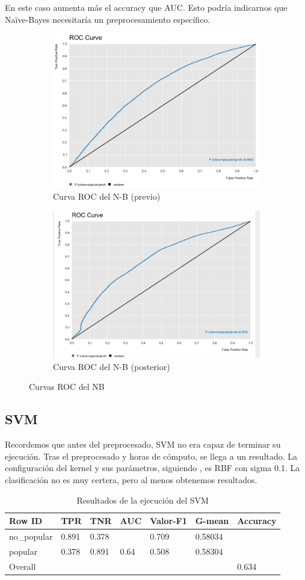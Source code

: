 En este caso aumenta más el accuracy que AUC. Esto podría indicarnos que Naïve-Bayes necesitaría un preprocesamiento específico.

\begin{figure}[H]
	\begin{subfigure}{.5\textwidth}
		\centering
		\includegraphics[width=.4\linewidth]{roc-nb-p.png}
		\caption{Curva ROC del N-B (previo)}
		\label{fig:rcnbp}
	\end{subfigure}%
	\begin{subfigure}{.5\textwidth}
		\centering
		\includegraphics[width=.4\linewidth]{roc-nb.png}
		\caption{Curva ROC del N-B (posterior)}
		\label{fig:rcnb}
	\end{subfigure}
	\caption{Curvas ROC del NB}
	\label{fig:nb}
\end{figure}


\subsection{SVM}

Recordemos que antes del preprocesado, SVM no era capaz de terminar su ejecución. Tras el preprocesado y horas de cómputo, se llega a un resultado. La configuración del kernel y sus parámetros, siguiendo \cite{main-article}, es RBF con sigma 0.1. La clasificación no es muy certera, pero al menos obtenemos resultados.

\begin{table}[H]
	\centering
	\begin{tabular}{|l|l|l|l|l|l|l|}
		\hline
		Row ID      & TPR   & TNR   & AUC   & Valor-F1 & G-mean   & Accuracy \\ \hline
		no\_popular & 0.891 & 0.378 &       & 0.709     & 0.58034 &          \\ \hline
		popular     & 0.378 & 0.891 & 0.64 & 0.508    & 0.58304 &          \\ \hline
		Overall     &       &       &       &          &          & 0.634    \\ \hline
	\end{tabular}
	\caption{Resultados de la ejecución del SVM}
	\label{tab:svm}
\end{table}
	
